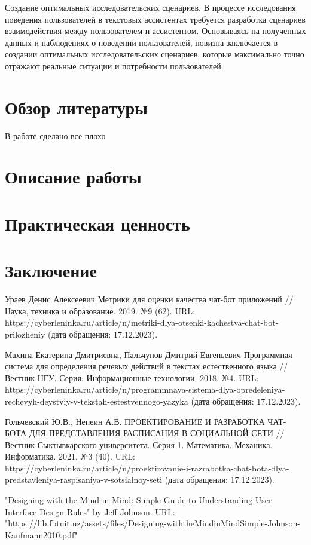 \documentclass{article}
\begin{document}
Создание оптимальных исследовательских сценариев. В процессе исследования поведения пользователей в текстовых ассистентах требуется разработка сценариев взаимодействия между пользователем и ассистентом. Основываясь на полученных данных и наблюдениях о поведении пользователей, новизна заключается в создании оптимальных исследовательских сценариев, которые максимально точно отражают реальные ситуации и потребности пользователей.
\section{Обзор литературы}
В работе \cite{greenwade93} сделано все плохо
\section{Описание работы}
\section{Практическая ценность}
\section{Заключение}




   
Ураев Денис Алексеевич Метрики для оценки качества чат-бот приложений // Наука, техника и образование. 2019. №9 (62). URL: https://cyberleninka.ru/article/n/metriki-dlya-otsenki-kachestva-chat-bot-prilozheniy (дата обращения: 17.12.2023).

Махина Екатерина Дмитриевна, Пальчунов Дмитрий Евгеньевич Программная система для определения речевых действий в текстах естественного языка // Вестник НГУ. Серия: Информационные технологии. 2018. №4. URL: https://cyberleninka.ru/article/n/programmnaya-sistema-dlya-opredeleniya-rechevyh-deystviy-v-tekstah-estestvennogo-yazyka (дата обращения: 17.12.2023).

Гольчевский Ю.В., Непеин А.В. ПРОЕКТИРОВАНИЕ И РАЗРАБОТКА ЧАТ-БОТА ДЛЯ ПРЕДСТАВЛЕНИЯ РАСПИСАНИЯ В СОЦИАЛЬНОЙ СЕТИ // Вестник Сыктывкарского университета. Серия 1. Математика. Механика. Информатика. 2021. №3 (40). URL: https://cyberleninka.ru/article/n/proektirovanie-i-razrabotka-chat-bota-dlya-predstavleniya-raspisaniya-v-sotsialnoy-seti (дата обращения: 17.12.2023).

"Designing with the Mind in Mind: Simple Guide to Understanding User Interface Design Rules" by Jeff Johnson. URL: "https://lib.fbtuit.uz/assets/files/Designing-withtheMindinMindSimple-Johnson-Kaufmann2010.pdf"
\end{document}
